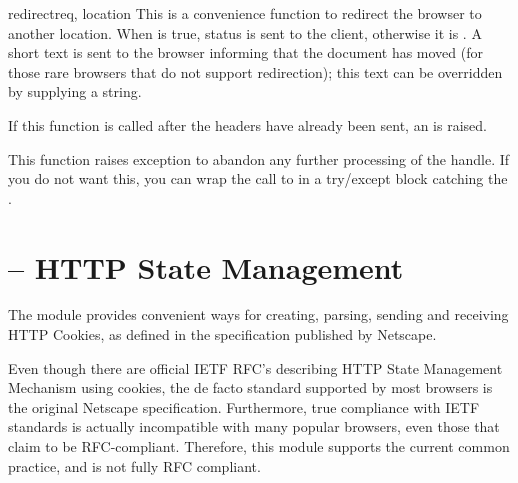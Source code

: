 \begin{funcdesc}{redirect}{req, location}
  This is a convenience function to redirect the browser to another
  location. When  is true, 
  status is sent to the client, otherwise it is
  . A short text is sent to the browser
  informing that the document has moved (for those rare browsers that
  do not support redirection); this text can be overridden by
  supplying a  string.

  If this function is called after the headers have already been sent,
  an  is raised.

  This function raises  exception to
  abandon any further processing of the handle. If you do not want
  this, you can wrap the call to  in a try/except
  block catching the .
\end{funcdesc}

\section{ -- HTTP State Management\label{pyapi-cookie}}

The  module provides convenient ways for creating,
parsing, sending and receiving HTTP Cookies, as defined in the
specification published by Netscape.

\begin{notice}
  Even though there are official IETF RFC's describing HTTP State
  Management Mechanism using cookies, the de facto standard supported
  by most browsers is the original Netscape specification.
  Furthermore, true compliance with IETF standards is actually
  incompatible with many popular browsers, even those that claim to be
  RFC-compliant.  Therefore, this module supports the current common
  practice, and is not fully RFC compliant.
\end{notice}

\begin{seealso}
\end{seealso}

